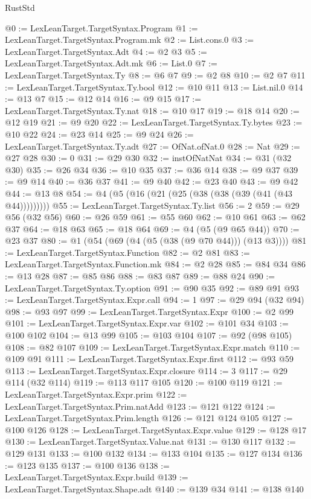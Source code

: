 \begin{lexlean}{RustStd}
\begin{coremodule}
@0 := LexLeanTarget.TargetSyntax.Program
@1 := LexLeanTarget.TargetSyntax.Program.mk
@2 := List.cons.{0}
@3 := LexLeanTarget.TargetSyntax.Adt
@4 := @2 @3
@5 := LexLeanTarget.TargetSyntax.Adt.mk
@6 := List.{0}
@7 := LexLeanTarget.TargetSyntax.Ty
@8 := @6 @7
@9 := @2 @8
@10 := @2 @7
@11 := LexLeanTarget.TargetSyntax.Ty.bool
@12 := @10 @11
@13 := List.nil.{0}
@14 := @13 @7
@15 := @12 @14
@16 := @9 @15
@17 := LexLeanTarget.TargetSyntax.Ty.nat
@18 := @10 @17
@19 := @18 @14
@20 := @12 @19
@21 := @9 @20
@22 := LexLeanTarget.TargetSyntax.Ty.bytes
@23 := @10 @22
@24 := @23 @14
@25 := @9 @24
@26 := LexLeanTarget.TargetSyntax.Ty.adt
@27 := OfNat.ofNat.{0}
@28 := Nat
@29 := @27 @28
@30 := 0
@31 := @29 @30
@32 := instOfNatNat
@34 := @31 (@32 @30)
@35 := @26 @34
@36 := @10 @35
@37 := @36 @14
@38 := @9 @37
@39 := @9 @14
@40 := @36 @37
@41 := @9 @40
@42 := @23 @40
@43 := @9 @42
@44 := @13 @8
@54 := @4 (@5 (@16 (@21 (@25 (@38 (@38 (@39 (@41 (@43 @44)))))))))
@55 := LexLeanTarget.TargetSyntax.Ty.list
@56 := 2
@59 := @29 @56 (@32 @56)
@60 := @26 @59
@61 := @55 @60
@62 := @10 @61
@63 := @62 @37
@64 := @18 @63
@65 := @18 @64
@69 := @4 (@5 (@9 @65 @44))
@70 := @23 @37
@80 := @1 (@54 (@69 (@4 (@5 (@38 (@9 @70 @44))) (@13 @3))))
@81 := LexLeanTarget.TargetSyntax.Function
@82 := @2 @81
@83 := LexLeanTarget.TargetSyntax.Function.mk
@84 := @2 @28
@85 := @84 @34
@86 := @13 @28
@87 := @85 @86
@88 := @83 @87
@89 := @88 @24
@90 := LexLeanTarget.TargetSyntax.Ty.option
@91 := @90 @35
@92 := @89 @91
@93 := LexLeanTarget.TargetSyntax.Expr.call
@94 := 1
@97 := @29 @94 (@32 @94)
@98 := @93 @97
@99 := LexLeanTarget.TargetSyntax.Expr
@100 := @2 @99
@101 := LexLeanTarget.TargetSyntax.Expr.var
@102 := @101 @34
@103 := @100 @102
@104 := @13 @99
@105 := @103 @104
@107 := @92 (@98 @105)
@108 := @82 @107
@109 := LexLeanTarget.TargetSyntax.Expr.match
@110 := @109 @91
@111 := LexLeanTarget.TargetSyntax.Expr.first
@112 := @93 @59
@113 := LexLeanTarget.TargetSyntax.Expr.closure
@114 := 3
@117 := @29 @114 (@32 @114)
@119 := @113 @117 @105
@120 := @100 @119
@121 := LexLeanTarget.TargetSyntax.Expr.prim
@122 := LexLeanTarget.TargetSyntax.Prim.natAdd
@123 := @121 @122
@124 := LexLeanTarget.TargetSyntax.Prim.length
@126 := @121 @124 @105
@127 := @100 @126
@128 := LexLeanTarget.TargetSyntax.Expr.value
@129 := @128 @17
@130 := LexLeanTarget.TargetSyntax.Value.nat
@131 := @130 @117
@132 := @129 @131
@133 := @100 @132
@134 := @133 @104
@135 := @127 @134
@136 := @123 @135
@137 := @100 @136
@138 := LexLeanTarget.TargetSyntax.Expr.build
@139 := LexLeanTarget.TargetSyntax.Shape.adt
@140 := @139 @34
@141 := @138 @140

\end{coremodule}
\end{lexlean}

